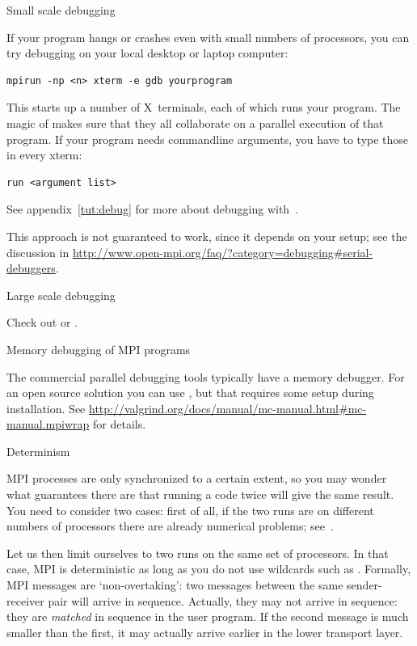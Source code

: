  {Small scale debugging}

If your program hangs or crashes even with small numbers of
processors, you can try debugging on your local desktop or laptop
computer:
\begin{verbatim}
mpirun -np <n> xterm -e gdb yourprogram
\end{verbatim}
This starts up a number of X~terminals, each of which runs your
program. The magic of  makes sure that they all collaborate
on a parallel execution of that program. If your program needs
commandline arguments, you have to type those in every xterm:
\begin{verbatim}
run <argument list>
\end{verbatim}
See appendix~\ref{tut:debug} for more about debugging with~.

This approach is not guaranteed to work, since it depends on
your  setup; see the discussion
in \url{http://www.open-mpi.org/faq/?category=debugging#serial-debuggers}.

 {Large scale debugging}

Check out  or .

 {Memory debugging of MPI programs}

The commercial parallel debugging tools typically have a memory
debugger. For an open source solution you can
use , but that requires some setup during
installation. See \url{http://valgrind.org/docs/manual/mc-manual.html#mc-manual.mpiwrap}
for details.

 {Determinism}
\label{sec:mpi-semantics}

MPI processes are only synchronized to a certain extent, so you may
wonder what guarantees there are that running a code twice will give
the same result.  You need to consider two cases: first of all, if the
two runs are on different numbers of processors there are already
numerical problems; see~.

Let us then limit ourselves to two runs on the same set of processors. 
In that case, MPI is deterministic as long as you do not use 
wildcards such as . Formally, 
MPI messages are `non-overtaking': two messages between the same
sender-receiver pair will arrive in sequence.
Actually, they may not arrive in sequence: they are \emph{matched}
in sequence in the user program. If the second message is much smaller than the first,
it may actually arrive earlier in the lower transport layer.

